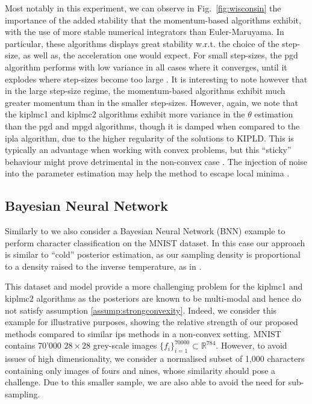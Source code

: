 Most notably in this experiment, we can observe in Fig.~\ref{fig:wisconsin} the importance of the added stability that the momentum-based algorithms exhibit, with the use of more stable numerical integrators than Euler-Maruyama. In particular, these algorithms displays great stability w.r.t. the choice of the step-size, as well as, the acceleration one would expect. For small step-sizes, the \gls*{pgd} algorithm performs with low variance in all cases where it converges, until it explodes where step-sizes become too large . It is interesting to note however that in the large step-size regime, the momentum-based algorithms exhibit much greater momentum than in the smaller step-sizes. However, again, we note that the \gls*{kiplmc1} and \gls*{kiplmc2} algorithms exhibit more variance in the $\theta$ estimation than the \gls*{pgd} and \gls*{mpgd} algorithms, though it is damped when compared to the \gls*{ipla} algorithm, due to the higher regularity of the solutions to KIPLD. This is typically an advantage when working with convex problems, but this ``sticky'' behaviour might prove detrimental in the non-convex case \citep{gao2022global, akyildiz2025interacting}. The injection of noise into the parameter estimation may help the method to escape local minima \citep{akyildiz2024nonasymptotic}.


\subsection{Bayesian Neural Network}\label{sec:bnn}
Similarly to \citep{kuntz2023particle, lim2023momentum} we also consider a Bayesian Neural Network (BNN) example to perform character classification on the MNIST dataset. In this case our approach is similar to ``cold'' posterior estimation, as our sampling density is proportional to a density raised to the inverse temperature, as in \citep{coldposterior}.

This dataset and model provide a more challenging problem for the \gls*{kiplmc1} and \gls*{kiplmc2} algorithms as the posteriors are known to be multi-modal and hence do not satisfy assumption \ref{assump:strongconvexity}. Indeed, we consider this example for illustrative purposes, showing the relative strength of our proposed methods compared to similar \gls*{ips} methods in a non-convex setting. MNIST contains 70'000 $28\times 28$ grey-scale images $\{f_i\}_{i=1}^{70000} \subset \mathbb{R}^{784}$. However, to avoid issues of high dimensionality, we consider a normalised subset of 1,000 characters containing only images of fours and nines, whose similarity should pose a challenge. Due to this smaller sample, we are also able to avoid the need for sub-sampling.

